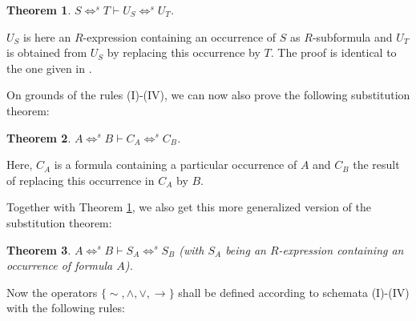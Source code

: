 \documentclass{article}%
\theoremstyle{break}
\newtheorem{theorem}{Theorem}[section]
\begin{document}
\begin{theorem}\label{substitution}$S \Leftrightarrow^{s} T \vdash U_S \Leftrightarrow^{s} U_T$.
\end{theorem} 

\noindent $U_S$ is here an $R$-expression containing an occurrence of $S$ as $R$-subformula and $U_T$ is obtained from $U_S$ by replacing this occurrence by $T$. 
The proof is identical to the one given in \cite[p. 8]{Kutschera1968}.



\noindent On grounds of the rules (I)-(IV), we can now also prove the following substitution theorem:


\begin{theorem}\label{substitution2}
$ A \Leftrightarrow^{s} B \vdash  C_A \Leftrightarrow^{s} C_B$.
\end{theorem}

\noindent Here, $C_A$ is a formula containing a particular occurrence of $A$ and $C_B$ the result of replacing this occurrence in $C_A$ by $B$. 

Together with Theorem \ref{substitution}, we also get this more generalized version of the substitution theorem:

\begin{theorem}\label{substitution3}
$ A \Leftrightarrow^{s} B \vdash S_A \Leftrightarrow^{s} S_B$ (with $S_A$ being an $R$-expression containing an occurrence of formula $A$).
\end{theorem}


\noindent Now the operators $\{{\sim}, \wedge, \vee, \rightarrow\}$ shall be defined according to schemata (I)-(IV) with the following rules:

\vspace{0.2cm}
\quad  {} \qquad {}

\vspace{0.2cm}
\quad {} \qquad {}

\vspace{0.2cm}
\quad {} \qquad {}
\end{document}
